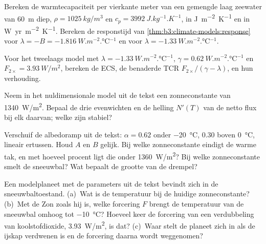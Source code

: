 \begin{exercise}[$\star$]\label{exo:b3:climate-models:3}
Bereken de warmtecapaciteit per vierkante meter van een gemengde laag zeewater van
\qty{60}{m} diep, $\rho = \qty{1025}{kg/m^3}$ en $c_p = \qty{3992}{J.kg^{-1}.K^{-1}}$,
in \unit{J.m^{-2}.K^{-1}} en in \unit{W.yr.m^{-2}.K^{-1}}. Bereken de
responstijd van \cref{thm:b3:climate-models:response} voor $\lambda = -B =
\qty{-1.816}{W.m^{-2}.\celsius^{-1}}$ en voor $\lambda =
\qty{-1.33}{W.m^{-2}.\celsius^{-1}}$.
\end{exercise}

\begin{exercise}[$\star$]\label{exo:b3:climate-models:4}
Voor het tweelaags model met $\lambda = \qty{-1.33}{W.m^{-2}.\celsius^{-1}}$,
$\gamma = \qty{0.62}{W.m^{-2}.\celsius^{-1}}$ en $F_{2\times} =
\qty{3.93}{W/m^2}$, bereken de ECS, de benaderde TCR $F_{2\times}/
(\gamma - \lambda)$, en hun verhouding.
\end{exercise}

\begin{exercise}[$\star\star$]\label{exo:b3:climate-models:5}
Neem in het nuldimensionale model uit de tekst een zonneconstante van
\qty{1340}{W/m^2}. Bepaal de drie evenwichten en de helling $N'(T)$ van de
netto flux bij elk daarvan; welke zijn stabiel?
\end{exercise}

\begin{exercise}[$\star\star$]\label{exo:b3:climate-models:6}
Verschuif de albedoramp uit de tekst: $\alpha = 0.62$ onder \qty{-20}{\celsius},
$0.30$ boven \qty{0}{\celsius}, lineair ertussen. Houd $A$ en $B$ gelijk. Bij welke
zonneconstante eindigt de warme tak, en met hoeveel procent ligt die
onder \qty{1360}{W/m^2}? Bij welke zonneconstante smelt de sneeuwbal?
Wat bepaalt de grootte van de drempel?
\end{exercise}

\begin{exercise}[$\star\star$]\label{exo:b3:climate-models:7}
Een modelplaneet met de parameters uit de tekst bevindt zich in de sneeuwbaltoestand.
(a)~Wat is de temperatuur bij de huidige zonneconstante? (b)~Met de Zon zoals hij is,
welke forcering $F$ brengt de temperatuur van de sneeuwbal omhoog tot
\qty{-10}{\celsius}? Hoeveel keer de forcering van een verdubbeling van
koolstofdioxide, \qty{3.93}{W/m^2}, is dat? (c)~Waar stelt de planeet zich in als de ijskap verdwenen is
en de forcering daarna wordt weggenomen?
\end{exercise}


